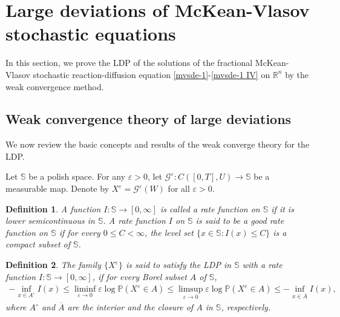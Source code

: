 \documentclass[11pt]{article}
\numberwithin{equation}{section}
\theoremstyle{plain}
\newtheorem{definition}{Definition}[section]
\def\leq{\leqslant}
\begin{document}
\section{Large deviations of    McKean-Vlasov stochastic equations}

 In this section,
 we   prove
 the LDP  of
 the  solutions
 of the
 fractional McKean-Vlasov stochastic reaction-diffusion equation
   \eqref{mvsde-1}-\eqref{mvsde-1 IV}
 on $\mathbb{R}^n$
 by the weak convergence method.


\subsection{Weak convergence theory
    of      large deviations}

 We now review the  basic concepts and results
 of the weak converge theory
 for the LDP.

 Let $\mathbb{S}$ be a polish space.
 For any $\varepsilon>0$,
 let $\mathcal{G}^\varepsilon:
                C([0,T],U)\rightarrow\mathbb{S}$
 be a measurable map.
 Denote by
    $ X^\varepsilon = \mathcal{G}^\varepsilon(W) $
 for all $\varepsilon > 0$.



\begin{definition}
 A function $I: \mathbb{S} \rightarrow [0,\infty]$ is called a rate function on $\mathbb{S}$
 if it is lower semicontinuous in $\mathbb{S}$.
 A rate function $I$ on $\mathbb{S}$ is said to be a good rate function on $\mathbb{S}$
 if for every $0\leq C<\infty$,
 the level set $\{ x \in \mathbb{S}: I(x) \leq C \}$ is a compact subset of $\mathbb{S}$.
\end{definition}

\begin{definition}
  The family $\{X^\varepsilon\}$ is said to satisfy the LDP
   in $\mathbb{S}$
  with a rate function $I:\mathbb{S}\rightarrow[0,\infty]$,
  if for every Borel subset $A$ of $\mathbb{S}$,
  \begin{align*}
   -\inf_{x \in A^\circ} I(x)
   \leq \liminf_{\varepsilon \rightarrow 0} \varepsilon \log \mathbb{P}(X^\varepsilon \in A)
   \leq \limsup_{\varepsilon \rightarrow 0} \varepsilon \log \mathbb{P}(X^\varepsilon \in A)
   \leq -\inf_{x \in \overline{A}} I(x),
 \end{align*}
 where $A^\circ$ and $\overline{A}$ are the interior and the closure of $A$ in $\mathbb{S}$, respectively.
\end{definition}
\end{document}
